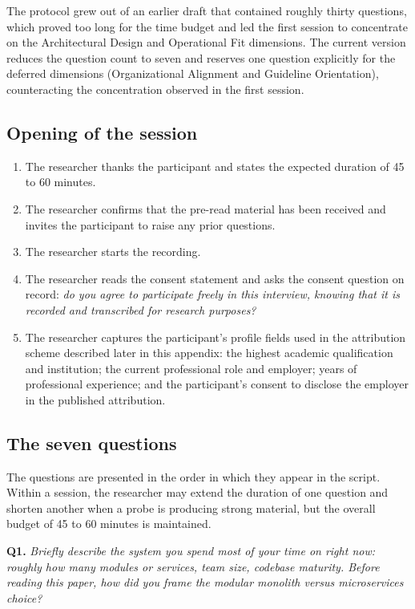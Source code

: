 The protocol grew out of an earlier draft that contained roughly thirty questions, which proved too long for the time budget and led the first session to concentrate on the Architectural Design and Operational Fit dimensions. The current version reduces the question count to seven and reserves one question explicitly for the deferred dimensions (Organizational Alignment and Guideline Orientation), counteracting the concentration observed in the first session.

\subsection*{Opening of the session}

\begin{enumerate}[itemsep=4pt,topsep=2pt]
  \item The researcher thanks the participant and states the expected duration of 45 to 60 minutes.
  \item The researcher confirms that the pre-read material has been received and invites the participant to raise any prior questions.
  \item The researcher starts the recording.
  \item The researcher reads the consent statement and asks the consent question on record: \emph{do you agree to participate freely in this interview, knowing that it is recorded and transcribed for research purposes?}
  \item The researcher captures the participant's profile fields used in the attribution scheme described later in this appendix: the highest academic qualification and institution; the current professional role and employer; years of professional experience; and the participant's consent to disclose the employer in the published attribution.
\end{enumerate}

\subsection*{The seven questions}

The questions are presented in the order in which they appear in the script. Within a session, the researcher may extend the duration of one question and shorten another when a probe is producing strong material, but the overall budget of 45 to 60 minutes is maintained.

\noindent\textbf{Q1.} \emph{Briefly describe the system you spend most of your time on right now: roughly how many modules or services, team size, codebase maturity. Before reading this paper, how did you frame the modular monolith versus microservices choice?}


